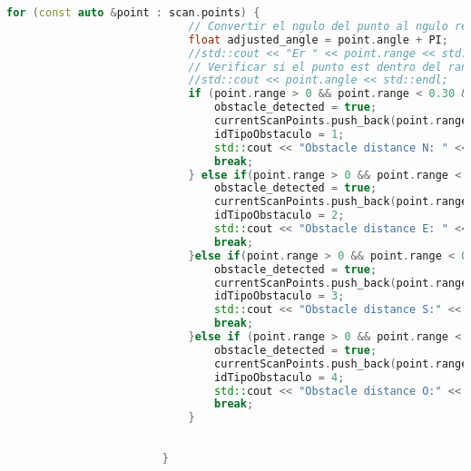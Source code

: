\begin{lstlisting}[language={C++}, caption={Quinto ajuste de c\'odigo}, label={QuintoAjuste}]
                        for (const auto &point : scan.points) {
                            // Convertir el ngulo del punto al ngulo relativo al "sur" del robot
                            float adjusted_angle = point.angle + PI;
                            //std::cout << "Er " << point.range << std::endl;
                            // Verificar si el punto est dentro del rango frontal de 30
                            //std::cout << point.angle << std::endl;
                            if (point.range > 0 && point.range < 0.30 && ( point.angle <= -0.5235f  && point.angle >= -2.617f)) { // Norte
                                obstacle_detected = true;
                                currentScanPoints.push_back(point.range);
                                idTipoObstaculo = 1;
                                std::cout << "Obstacle distance N: " << (float)point.range  << " Y en el angulo  "<<point.angle << std::endl;
                                break;
                            } else if(point.range > 0 && point.range < 0.25 && (point.angle <= 0.872f  && point.angle>= -0.5235f)){ // Este
                                obstacle_detected = true;
                                currentScanPoints.push_back(point.range);
                                idTipoObstaculo = 2;
                                std::cout << "Obstacle distance E: " << (float)point.range  << " Y en el angulo  "<<point.angle << std::endl;
                                break;
                            }else if(point.range > 0 && point.range < 0.45 && (point.angle <= 2.26f && point.angle >= 0.872f)){ // Sur
                                obstacle_detected = true;
                                currentScanPoints.push_back(point.range);
                                idTipoObstaculo = 3;
                                std::cout << "Obstacle distance S:" << (float)point.range  << " Y en el angulo  "<<point.angle << std::endl;
                                break;
                            }else if (point.range > 0 && point.range < 0.25 && (point.angle <= -2.61f  || point.angle >= 2.27f)){ // Oeste
                                obstacle_detected = true;
                                currentScanPoints.push_back(point.range);
                                idTipoObstaculo = 4;
                                std::cout << "Obstacle distance O:" << (float)point.range  << " Y en el angulo  "<<point.angle << std::endl;
                                break;
                            }
                            
                            
                        }
                        

\end{lstlisting}
